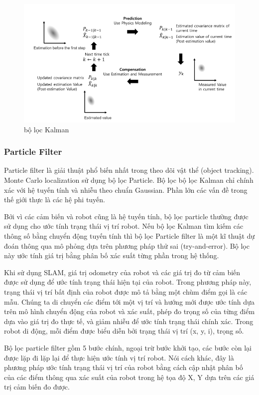 {{\begin{figure}[htbp]
  \centering
  \includegraphics[width=\linewidth]{figures/BasicConceptKalmanFilter.png}
  \caption{bộ lọc Kalman\cite{pyo2017ros}}
  \label{fig:BasicConceptKalmanFilter}
\end{figure}

\subsubsection*{Particle Filter}
Particle filter là giải thuật phổ biến nhất trong theo dõi vật thể (object tracking). Monte Carlo localization sử dụng bộ lọc Particle. Bộ lọc bộ lọc Kalman chỉ chính xác với hệ tuyến tính và nhiễu theo chuẩn Gaussian. Phần lớn các vấn đề trong thế giới thực là các hệ phi tuyến.

Bởi vì các cảm biến và robot cũng là hệ tuyến tính, bộ lọc particle thường được sử dụng cho ước tính trạng thái vị trí robot. Nếu bộ lọc Kalman tìm kiếm các thông số bằng chuyển động tuyến tính thì bộ lọc Particle filter là một kĩ thuật dự đoán thông qua mô phỏng dựa trên phương pháp thử sai (try-and-error). Bộ lọc này ước tính giá trị bằng phân bố xác suất từng phần trong hệ thống.

Khi sử dụng SLAM, giá trị odometry của robot và các giá trị đo từ cảm biến được sử dụng để ước tính trạng thái hiện tại của robot. Trong phương pháp này, trạng thái vị trí bất định của robot được mô tả bằng một chùm điểm gọi là các mẫu. Chúng ta di chuyển các điểm tới một vị trí và hướng mới được ước tính dựa trên mô hình chuyển động của robot và xác suất, phép đo trọng số của từng điểm dựa vào giá trị đo thực tế, và giảm nhiễu để ước tính trạng thái chính xác. Trong robot di động, mỗi điểm được biểu diễn bởi trạng thái vị trí (x, y, i), trọng số.

Bộ lọc particle filter gồm 5 bước chính, ngoại trừ bước khởi tạo, các bước còn lại được lặp đi lặp lại để thực hiện ước tính vị trí robot. Nói cách khác, đây là phương pháp ước tính trạng thái vị trí của robot bằng cách cập nhật phân bố của các điểm thông qua xác suất của robot trong hệ tọa độ X, Y dựa trên các giá trị cảm biến đo được.

}}
